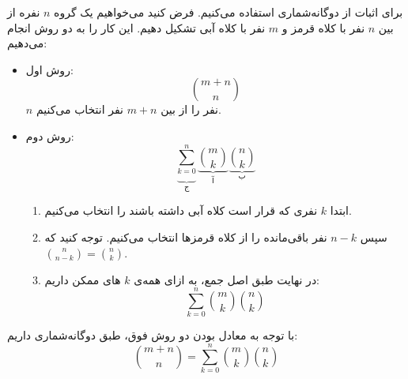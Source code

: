\p
برای اثبات از دوگانه‌شماری استفاده می‌کنیم.
فرض کنید می‌خواهیم
یک گروه 
$n$
نفره 
از بین
$n$ 
نفر با کلاه قرمز و
$m$
نفر با کلاه آبی تشکیل دهیم.
این کار را به دو روش انجام می‌دهیم:
\begin{itemize}
    \item 
    روش اول: 
    $$\binom{m + n}{n}$$
    $n$
    نفر را از بین 
    $m + n$
    نفر انتخاب می‌کنیم.  
    \item 
    روش دوم: 
    $$ \underbrace{\sum\limits_{k=0}^{n}}_{\text{ج}} \underbrace{\binom{m}{k}}_{\text{آ}} \underbrace{\binom{n}{k}}_{\text{ب}}$$
    \begin{enumerate}
    \item 
    ابتدا 
    $k$ 
    نفری که قرار است کلاه آبی داشته باشند را انتخاب می‌کنیم.
    \item 
    سپس 
    $n-k$ 
    نفر باقی‌مانده را از کلاه قرمزها انتخاب می‌کنیم. توجه کنید که
    $ \binom{n}{n-k} = \binom{n}{k}$.
    \item 
    در نهایت طبق اصل جمع، به ازای همه‌ی 
    $k$
    های ممکن داریم:
     $$\sum\limits_{k=0}^{n} \binom{m}{k} \binom{n}{k}$$
    \end{enumerate}
\end{itemize}
با توجه به معادل بودن دو روش فوق، طبق دوگانه‌شماری داریم:
$$\binom{m + n}{n} = \sum\limits_{k=0}^{n} \binom{m}{k} \binom{n}{k}$$